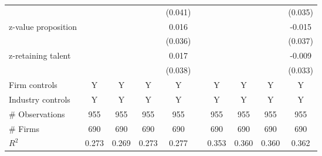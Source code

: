 {\begin{tabular}{l*{9}{c}}
                &            &            &            &  (0.041) &  &            &            &            &  (0.035)   \\
z-value proposition        &            &            &            &    0.016   &&            &            &            &   -0.015   \\
                &            &            &            &  (0.036)   &&            &            &            &  (0.037)   \\
z-retaining talent        &            &            &            &    0.017  & &            &            &            &   -0.009   \\
                &            &            &            &  (0.038)  & &            &            &            &  (0.033)   \\
Firm controls   &      Y   &      Y   &      Y   &      Y   &&      Y   &      Y   &      Y   &      Y   \\
Industry controls &      Y   &      Y   &      Y   &      Y   &&      Y   &      Y   &      Y   &      Y   \\
\midrule
\# Observations &\multicolumn{1}{c}{955}   &\multicolumn{1}{c}{955}   &\multicolumn{1}{c}{955}   &\multicolumn{1}{c}{955}   &&\multicolumn{1}{c}{955}  &\multicolumn{1}{c}{955}   &\multicolumn{1}{c}{955}   &\multicolumn{1}{c}{955}   \\
\# Firms        &      690   &      690   &      690   &      690   &&      690   &      690   &      690   &      690   \\
\(R^{2}\)       &    0.273   &    0.269   &    0.273   &    0.277   & &   0.353   &    0.360   &    0.360   &    0.362   \\
\bottomrule
\end{tabular}
}
